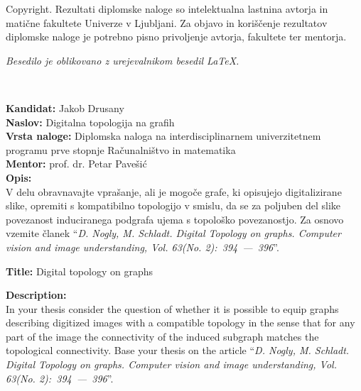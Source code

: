 \documentclass[a4paper, 12pt]{book}
\newcommand{\clearemptydoublepage}{\newpage{\pagestyle{empty}\cleardoublepage}}
\theoremstyle{definition}
\theoremstyle{remark}
\begin{document}
\thispagestyle{empty}
\vspace*{8cm}

\noindent
{\sc Copyright}. 
Rezultati diplomske naloge so intelektualna lastnina avtorja in matične fakultete Univerze v Ljubljani.
Za objavo in koriščenje rezultatov diplomske naloge je potrebno pisno privoljenje avtorja, fakultete ter mentorja.

\begin{center}
\mbox{}\vfill
\emph{Besedilo je oblikovano z urejevalnikom besedil \LaTeX.}
\end{center}
\clearemptydoublepage

\thispagestyle{empty}
\
\vfill

\bigskip
\noindent\textbf{Kandidat:} Jakob Drusany\\
\noindent\textbf{Naslov:} Digitalna topologija na grafih\\
\noindent\textbf{Vrsta naloge:} Diplomska naloga na interdisciplinarnem univerzitetnem programu prve stopnje Računalništvo in matematika\\
\noindent\textbf{Mentor:} prof. dr. Petar Pavešić\\

\bigskip
\noindent\textbf{Opis:}\\
V delu obravnavajte vprašanje, ali je mogoče grafe, ki opisujejo digitalizirane slike, opremiti s kompatibilno
topologijo v smislu, da se za poljuben del slike povezanost induciranega podgrafa ujema s topološko
povezanostjo. Za osnovo vzemite članek ``\textit{D. Nogly, M. Schladt. Digital Topology on graphs. Computer
vision and image understanding, Vol. 63(No. 2):\ 394\ ---\ 396}''.

\bigskip
\noindent\textbf{Title:} Digital topology on graphs

\bigskip
\noindent\textbf{Description:}\\
In your thesis consider the question of whether it is possible to equip graphs describing digitized images with a compatible
topology in the sense that for any part of the image the connectivity of the induced subgraph matches the topological connectivity.
Base your thesis on the article ``\textit{D. Nogly, M. Schladt. Digital Topology on graphs. Computer
vision and image understanding, Vol. 63(No. 2):\ 394\ ---\ 396}''.
\end{document}
